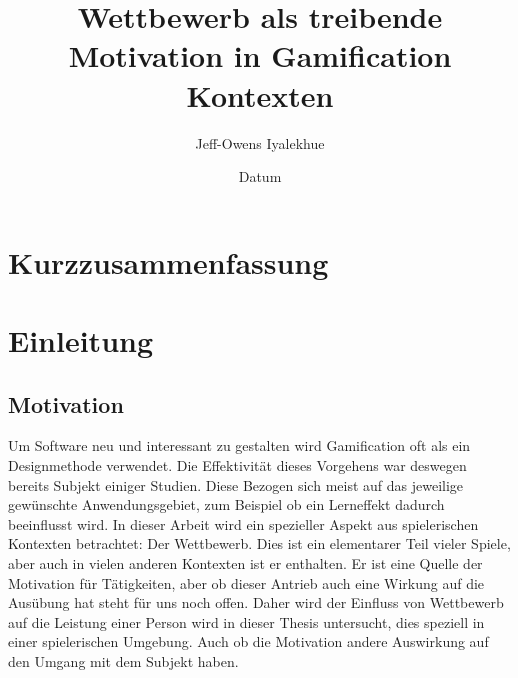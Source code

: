 %
% 
% 
%



\renewcommand{\Thema}{%
                        Wettbewerb als treibende Motivation in Gamification Kontexten}





\title{\Thema}
\author{Jeff-Owens Iyalekhue}
\date{Datum}

%
\tableofcontents %

\chapter{Kurzzusammenfassung}

\chapter{Einleitung}
\section{Motivation}
Um Software neu und interessant zu gestalten wird Gamification oft als ein Designmethode verwendet. Die Effektivität dieses Vorgehens war deswegen bereits Subjekt einiger Studien. Diese Bezogen sich meist auf das jeweilige gewünschte Anwendungsgebiet, zum Beispiel ob ein Lerneffekt dadurch beeinflusst wird. In dieser Arbeit wird ein spezieller Aspekt aus spielerischen Kontexten betrachtet: Der Wettbewerb.\newline
Dies ist ein elementarer Teil vieler Spiele, aber auch in vielen anderen Kontexten ist er enthalten. Er ist eine Quelle der Motivation für Tätigkeiten, aber ob dieser Antrieb auch eine Wirkung auf die Ausübung
hat steht für uns noch offen. Daher wird der Einfluss von Wettbewerb auf die Leistung einer Person wird in dieser Thesis untersucht, dies speziell in einer spielerischen Umgebung. Auch ob die Motivation andere Auswirkung auf den Umgang mit dem Subjekt haben.
%

